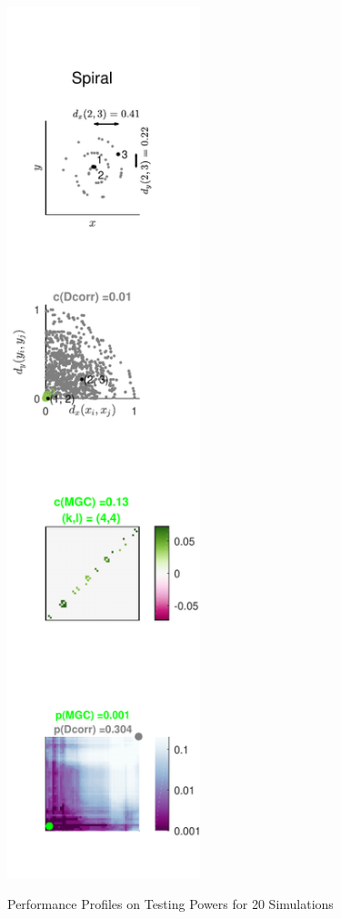 \documentclass[12pt]{article}
\begin{document}
\begin{figure}[htbp]
{\includegraphics[width=0.5\textwidth]{../Figures/Fig8}
}
\caption{Performance Profiles on Testing Powers for 20 Simulations}
\label{figSim3}
\end{figure}
\end{document}
